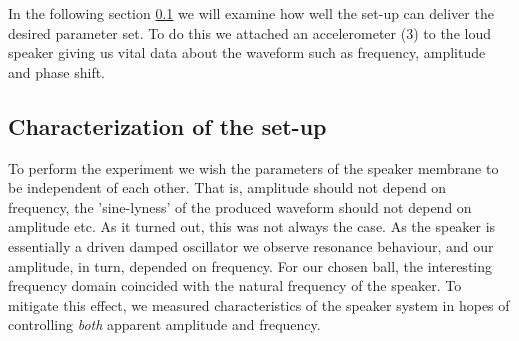 \documentclass[12pt,oneside,a4paper]{article}
\numberwithin{equation}{section}
\begin{document}
{{{{In the following section \ref{Characterization} we will examine how well the 
set-up can deliver the desired parameter set. To do this we attached an 
accelerometer (3) to the loud speaker giving us vital data about the waveform 
such as frequency, amplitude and phase shift.
\subsection{Characterization of the set-up}
\label{Characterization}
To perform the experiment we wish the parameters of the speaker membrane to be independent of each other. That is, amplitude should not depend on frequency, the 'sine-lyness' of the produced waveform should not depend on amplitude etc. As it turned out, this was not always the case. As the speaker is essentially a driven damped oscillator we observe resonance behaviour, and our amplitude, in turn, depended on frequency. For our chosen ball, the interesting frequency domain coincided with the natural frequency of the speaker. To mitigate this effect, we measured characteristics of the speaker system in hopes of controlling \emph{both} apparent amplitude and frequency.  

}}}}
\end{document}
